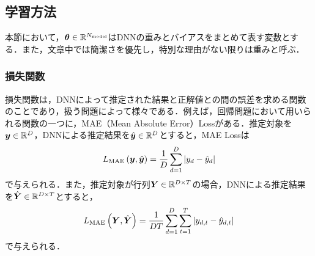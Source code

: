 \documentclass[12pt]{jarticle}
\numberwithin{equation}{section}    %
\numberwithin{figure}{section}      %
\numberwithin{table}{section}      %
\begin{document}
\subsection{学習方法}
本節において，$\bm{\theta} \in \mathbb{R}^{N_{\text{model}}}$はDNNの重みとバイアスをまとめて表す変数とする．また，文章中では簡潔さを優先し，特別な理由がない限りは重みと呼ぶ．

\subsubsection{損失関数}
損失関数は，DNNによって推定された結果と正解値との間の誤差を求める関数のことであり，扱う問題によって様々である．例えば，回帰問題において用いられる関数の一つに，MAE（Mean Absolute Error）Lossがある．推定対象を$\bm{y} \in \mathbb{R}^{D}$，DNNによる推定結果を$\hat{\bm{y}} \in \mathbb{R}^{D}$とすると，MAE Lossは
\begin{equation}
    L_{\text{MAE}}\left(\bm{y}, \hat{\bm{y}}\right) = \frac{1}{D} \sum_{d = 1}^{D}  |y_{d} - \hat{y}_{d}|
\end{equation}
で与えられる．また，推定対象が行列$\bm{Y} \in \mathbb{R}^{D \times T}$の場合，DNNによる推定結果を$\hat{\bm{Y}} \in \mathbb{R}^{D \times T}$とすると，
\begin{equation}
    L_{\text{MAE}}\left(\bm{Y}, \hat{\bm{Y}}\right) = \frac{1}{D T} \sum_{d = 1}^{D} \sum_{t = 1}^{T}  |y_{d, t} - \hat{y}_{d, t}|
\end{equation}
で与えられる．
\end{document}

